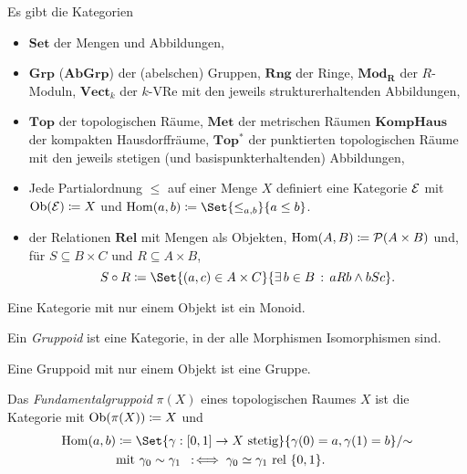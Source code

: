 \documentclass{cheat-sheet}
\newcommand{\rel}{\text{ rel }} %
\newcommand{\Pow}{\mathcal{P}} %
\begin{document}
\begin{bspe}
  Es gibt die Kategorien
  \begin{itemize}
    \item $\mathbf{Set}$ der Mengen und Abbildungen,
    \item $\mathbf{Grp}$ ($\mathbf{AbGrp}$) der (abelschen) Gruppen, $\mathbf{Rng}$ der Ringe, $\mathbf{Mod_R}$ der $R$-Moduln, $\mathbf{Vect}_k$ der $k$-VRe mit den jeweils strukturerhaltenden Abbildungen,
    \item $\mathbf{Top}$ der topologischen Räume, $\mathbf{Met}$ der metrischen Räumen $\mathbf{KompHaus}$ der kompakten Hausdorffräume, $\mathbf{Top^*}$ der punktierten topologischen Räume mit den jeweils stetigen (und basispunkterhaltenden) Abbildungen,
    \item Jede Partialordnung $\leq$ auf einer Menge $X$ definiert eine Kategorie $\mathcal{E}$ mit $\operatorname{Ob}(\mathcal{E}) \coloneqq X$ und $\Hom(a, b) \coloneqq \Set{ {\leq}_{a,b} }{ a \leq b }$.
    \item der Relationen $\mathbf{Rel}$ mit Mengen als Objekten, $\Hom(A, B) \coloneqq \Pow(A \times B)$ und, für $S \subseteq B \times C$ und $R \subseteq A \times B$,
    \[ S \circ R \coloneqq \Set{ (a, c) \in A \times C }{ \ex{b \in B} aRb \wedge bSc }. \]
  \end{itemize}
\end{bspe}

\begin{bem}
  Eine Kategorie mit nur einem Objekt ist ein Monoid.
\end{bem}

\begin{defn}
  Ein \emph{Gruppoid} ist eine Kategorie, in der alle Morphismen Isomorphismen sind.
\end{defn}

\begin{bem}
  Eine Gruppoid mit nur einem Objekt ist eine Gruppe.
\end{bem}

\begin{defn}
  Das \emph{Fundamentalgruppoid} $\pi(X)$ eines topologischen Raumes $X$ ist die Kategorie mit 
  $\operatorname{Ob}(\pi(X)) \coloneqq X$ und
  \begin{align*}
    \Hom(a, b) & \coloneqq \Set{ \gamma : \I \to X \text{ stetig} }{ \gamma(0) = a, \gamma(1) = b }/{\sim}\\
    & \text{mit } \gamma_0 \sim \gamma_1 \coloniff \gamma_0 \simeq \gamma_1 \rel \{ 0, 1\}.
  \end{align*}
\end{defn}
\end{document}
